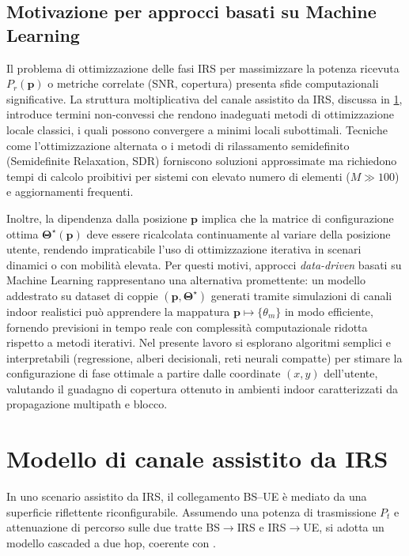 \documentclass[12pt,a4paper]{report}
\begin{document}
\subsection{Motivazione per approcci basati su Machine Learning}
Il problema di ottimizzazione delle fasi IRS per massimizzare la
potenza ricevuta $P_r(\mathbf{p})$ o metriche correlate (SNR,
copertura) presenta sfide computazionali significative. La struttura
moltiplicativa del canale assistito da IRS, discussa in
\cref{sec:canaleIRS},
introduce termini non-convessi che rendono inadeguati metodi di
ottimizzazione locale classici, i quali possono convergere a minimi
locali subottimali. Tecniche come l'ottimizzazione alternata o i
metodi di rilassamento semidefinito (Semidefinite Relaxation, SDR)
forniscono soluzioni
approssimate ma richiedono tempi di calcolo proibitivi per sistemi
con elevato numero di elementi ($M \gg 100$) e aggiornamenti
frequenti.

Inoltre, la dipendenza dalla posizione $\mathbf{p}$ implica che la
matrice di configurazione ottima $\boldsymbol{\Theta}^\star(\mathbf{p})$
deve essere ricalcolata continuamente al variare della posizione
utente, rendendo impraticabile l'uso di ottimizzazione iterativa in
scenari dinamici o con mobilità elevata. Per questi motivi, approcci
\emph{data-driven} basati su Machine Learning rappresentano una
alternativa promettente: un modello addestrato su dataset di coppie
$(\mathbf{p}, \boldsymbol{\Theta}^\star)$ generati tramite simulazioni
di canali indoor realistici può apprendere la mappatura $\mathbf{p}
\mapsto \{\theta_m\}$ in modo efficiente, fornendo previsioni in
tempo reale con complessità computazionale ridotta rispetto a metodi
iterativi. Nel presente lavoro si esplorano algoritmi semplici e
interpretabili (regressione, alberi decisionali, reti neurali
compatte) per stimare la configurazione di fase ottimale a partire
dalle coordinate $(x, y)$ dell'utente, valutando il guadagno di
copertura ottenuto in ambienti indoor caratterizzati da propagazione
multipath e blocco.

\section{Modello di canale assistito da IRS}
\label{sec:canaleIRS}
In uno scenario assistito da IRS, il collegamento BS--UE è mediato da
una superficie riflettente riconfigurabile. Assumendo una potenza di
trasmissione $P_t$ e attenuazione di percorso sulle due tratte
BS$\to$IRS e IRS$\to$UE, si adotta un modello cascaded a due hop,
coerente con \cite{guo2021cascaded}.
\end{document}
